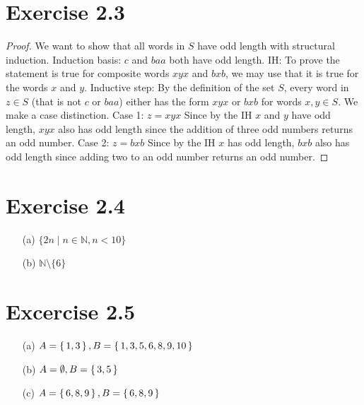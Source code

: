 \documentclass{article} %
\newcommand{\homeworkNumber}{2}
\begin{document}
\section*{Exercise \homeworkNumber.3}

\begin{proof}
We want to show that all words in $S$ have odd length with structural induction.\newline
Induction basis: $c$ and $baa$ both have odd length.
IH: To prove the statement is true for composite words $xyx$ and $bxb$, we may use that it is true for the words $x$ and $y$. \newline
Inductive step: By the definition of the set $S$, every word in $z \in S$ (that is not $c$ or $baa$) either has the form $xyx$ or $bxb$ for words $x,y \in S$. We make a case distinction. \newline
Case 1: $z = xyx$ \newline
Since by the IH $x$ and $y$ have odd length, $xyx$ also has odd length since the addition of three odd numbers returns an odd number. \newline
Case 2: $z = bxb$ \newline
Since by the IH $x$ has odd length, $bxb$ also has odd length since adding two to an odd number returns an odd number.
\end{proof}

\section*{Exercise \homeworkNumber.4}

\begin{enumerate}

\item[(a)] $\{2n \mid n \in \mathbb{N}, n < 10\}$

\item[(b)] $\mathbb{N} \setminus \{6\}$

\end{enumerate}


\section*{Excercise \homeworkNumber.5}

\begin{enumerate}

\item[(a)] $A = \set{1,3}, B = \set{1,3,5,6,8,9,10}$
\item[(b)] $A = \emptyset, B = \set{3,5}$
\item[(c)] $A = \set{6,8,9}, B = \set{6,8,9}$



\end{enumerate}
\end{document}

